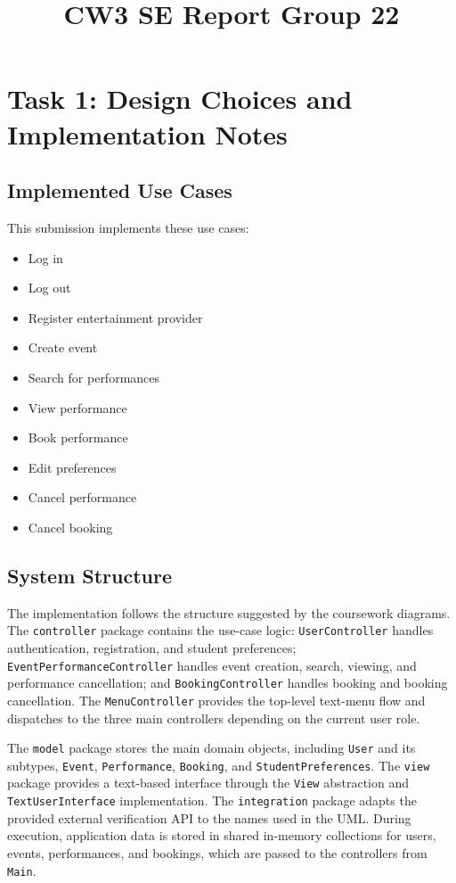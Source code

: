 \documentclass[11pt,a4paper]{article}
\title{\textbf{CW3 SE Report Group 22}}
\author{}
\date{}
\begin{document}
\maketitle
\thispagestyle{empty}

\vspace{1em}

\section{Task 1: Design Choices and Implementation Notes}

\subsection{Implemented Use Cases}

This submission implements these use cases:
\begin{itemize}
  \item Log in
  \item Log out
  \item Register entertainment provider
  \item Create event
  \item Search for performances
  \item View performance
  \item Book performance
  \item Edit preferences
  \item Cancel performance
  \item Cancel booking
\end{itemize}

\subsection{System Structure}

The implementation follows the structure suggested by the coursework diagrams. The
\texttt{controller} package contains the use-case logic: \texttt{UserController} handles
authentication, registration, and student preferences; \texttt{EventPerformanceController}
handles event creation, search, viewing, and performance cancellation; and
\texttt{BookingController} handles booking and booking cancellation. The
\texttt{MenuController} provides the top-level text-menu flow and dispatches to the
three main controllers depending on the current user role.

The \texttt{model} package stores the main domain objects, including \texttt{User} and
its subtypes, \texttt{Event}, \texttt{Performance}, \texttt{Booking}, and
\texttt{StudentPreferences}. The \texttt{view} package provides a text-based interface
through the \texttt{View} abstraction and \texttt{TextUserInterface} implementation.
The \texttt{integration} package adapts the provided external verification API to the
names used in the UML. During execution, application data is stored in shared in-memory
collections for users, events, performances, and bookings, which are passed to the
controllers from \texttt{Main}.
\end{document}
